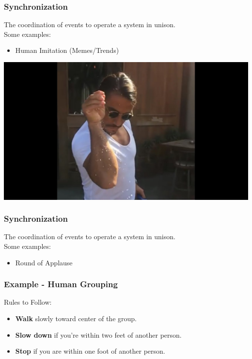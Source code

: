 \documentclass[xcolor=dvipsnames]{beamer}
\begin{document}
\begin{frame}
	\frametitle{Synchronization}
	The coordination of events to operate a system in unison.\\ 
	Some examples:
	\begin{itemize}
		\item Human Imitation (Memes/Trends) 
	\end{itemize}
	\begin{center}
	\includegraphics[scale=0.15]{images/salt_guy.jpg}
	\end{center}
\end{frame}

\begin{frame}
	\frametitle{Synchronization}
	The coordination of events to operate a system in unison.\\ 
	Some examples:
	\begin{itemize}
		\item Round of Applause
	\end{itemize}
\end{frame}


\begin{frame}
	\frametitle{Example - Human Grouping}
\noindent Rules to Follow:
\begin{itemize}
	\item \textbf{Walk} slowly toward center of the group.
	\item \textbf{Slow down} if you're within two feet of another person.
	\item \textbf{Stop} if you are within one foot of another person.
\end{itemize}

\end{frame}
\end{document}
